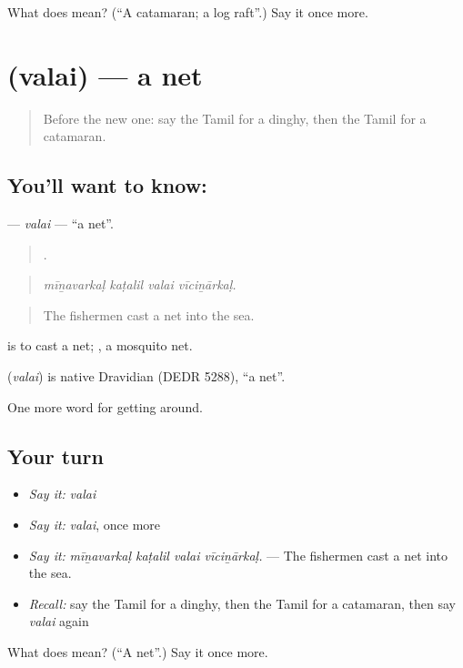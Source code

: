 \begin{tcolorbox}[breakable,colback=teal!4,colframe=teal!35!black,title={Before you move on}]
What does  mean? (\textquotedblleft{}A catamaran; a log raft\textquotedblright{}.) Say it once more.
\end{tcolorbox}
\section[\texorpdfstring{\ta{வலை} (valai)}{வலை (valai)}]{ (valai) — a net}

\label{lesson:TA-C416-valai}



\begin{quote}
Before the new one: say the Tamil for a dinghy, then the Tamil for a catamaran.
\end{quote}

\subsection*{You'll want to know: }
\textbf{} — \emph{valai} — \textquotedblleft{}a net\textquotedblright{}.

\begin{quote}
   .
\end{quote}

\begin{quote}
\emph{mīṉavarkaḷ kaṭalil valai vīciṉārkaḷ.}
\end{quote}

\begin{quote}
The fishermen cast a net into the sea.
\end{quote}

  is to cast a net; , a mosquito net.

\begin{cousinweb}
\textbf{} (\emph{valai}) is native Dravidian (DEDR 5288), \textquotedblleft{}a net\textquotedblright{}.
\end{cousinweb}

\begin{grammarlens}[title={What you've built}]
One more word for getting around.
\end{grammarlens}

\subsection*{Your turn}
\begin{itemize}
\raggedright
  \item \emph{Say it:} \emph{valai}
  \item \emph{Say it:} \emph{valai}, once more
  \item \emph{Say it:} \emph{mīṉavarkaḷ kaṭalil valai vīciṉārkaḷ.} — The fishermen cast a net into the sea.
  \item \emph{Recall:} say the Tamil for a dinghy, then the Tamil for a catamaran, then say \emph{valai} again
\end{itemize}

\begin{tcolorbox}[breakable,colback=teal!4,colframe=teal!35!black,title={Before you move on}]
What does  mean? (\textquotedblleft{}A net\textquotedblright{}.) Say it once more.
\end{tcolorbox}
